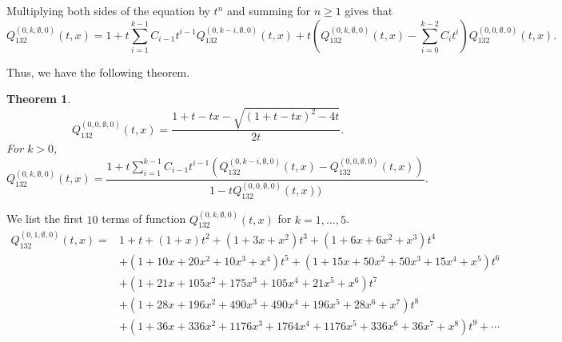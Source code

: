 \documentclass[
final,nomarks
]{dmtcs-episciences}
\newtheorem{theorem}{Theorem}
\newcommand{\Qmm}[1]{Q_{132}^{(#1)}(t,x)}
\begin{document}
Multiplying both sides of the equation by \begin{math}t^n\end{math} and summing for \begin{math}n\geq 1\end{math} gives that
\begin{equation}
\Qmm{0,k,\emptyset,0}=1+t\sum_{i=1}^{k-1}C_{i-1}t^{i-1}\Qmm{0,k-i,\emptyset,0}+t(\Qmm{0,k,\emptyset,0}-\sum_{i=0}^{k-2}C_i t^i)\Qmm{0,0,\emptyset,0}.
\end{equation}


Thus, we have the following theorem.
\begin{theorem}\label{theorem:6}
	\begin{equation}
	\Qmm{0,0,\emptyset,0}=\frac{1+t-t x -\sqrt{(1+t-t x)^2-4t}}{2t}.
	\end{equation}
	For \begin{math}k>0\end{math},
	\begin{equation}
	\Qmm{0,k,\emptyset,0}=\frac{1+t\sum_{i=1}^{k-1}C_{i-1}t^{i-1}(\Qmm{0,k-i,\emptyset,0}-\Qmm{0,0,\emptyset,0})}{1-t\Qmm{0,0,\emptyset,0})}.
	\end{equation}
\end{theorem}

We list the first \begin{math}10\end{math} terms of function \begin{math}\Qmm{0,k,\emptyset,0}\end{math} for \begin{math}k=1, \ldots, 5\end{math}.
\begin{align}
\Qmm{0,1,\emptyset,0}=&1+t+(1+x) t^2+\left(1+3 x+x^2\right) t^3+\left(1+6 x+6 x^2+x^3\right)
t^4\nonumber\\\nonumber
&+\left(1+10 x+20 x^2+10 x^3+x^4\right) t^5+\left(1+15 x+50 x^2+50 x^3+15
x^4+x^5\right) t^6\\\nonumber
&+\left(1+21 x+105 x^2+175 x^3+105 x^4+21 x^5+x^6\right)
t^7\\\nonumber
&+\left(1+28 x+196 x^2+490 x^3+490 x^4+196 x^5+28 x^6+x^7\right)
t^8\\
&+\left(1+36 x+336 x^2+1176 x^3+1764 x^4+1176 x^5+336 x^6+36
x^7+x^8\right) t^9+\cdots
\end{align}
\end{document}
